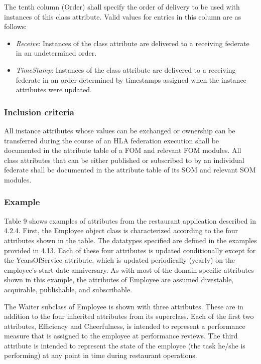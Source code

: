 The tenth column (Order) shall specify the order of delivery to be used with instances of this class attribute. Valid values for entries in this column are as follows:
\begin{itemize}[topsep=1pt,itemsep=2pt]
\item \textit{Receive}: Instances of the class attribute are delivered to a receiving federate in an undetermined order.
\item \textit{TimeStamp}: Instances of the class attribute are delivered to a receiving federate in an order determined by timestamps assigned when the instance attributes were updated.
\end{itemize}

\subsubsection{Inclusion criteria}
All instance attributes whose values can be exchanged or ownership can be transferred during the course of an HLA federation execution shall be documented in the attribute table of a FOM and relevant FOM modules. All class attributes that can be either published or subscribed to by an individual federate shall be documented in the attribute table of its SOM and relevant SOM modules.

\subsubsection{Example}
Table 9 shows examples of attributes from the restaurant application described in 4.2.4. First, the Employee object class is characterized according to the four attributes shown in the table. The datatypes specified are defined in the examples provided in 4.13. Each of these four attributes is updated conditionally except for the YearsOfService attribute, which is updated periodically (yearly) on the employee's start date anniversary. As with most of the domain-specific attributes shown in this example, the attributes of Employee are assumed divestable, acquirable, publishable, and subscribable.

The Waiter subclass of Employee is shown with three attributes. These are in addition to the four inherited attributes from its superclass. Each of the first two attributes, Efficiency and Cheerfulness, is intended to represent a performance measure that is assigned to the employee at performance reviews. The third attribute is intended to represent the state of the employee (the task he/she is performing) at any point in time during restaurant operations.

